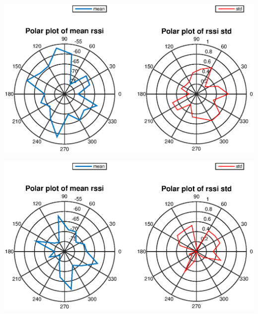 \documentclass[11pt]{beamer}
\begin{document}
%
%

\begin{frame}
\includegraphics[width=\textwidth]{radiation_pattern_indoor.eps} 
\end{frame}

\begin{frame}
\includegraphics[width=\textwidth]{radiation_pattern_grass.eps} 
\end{frame}
\end{document}
